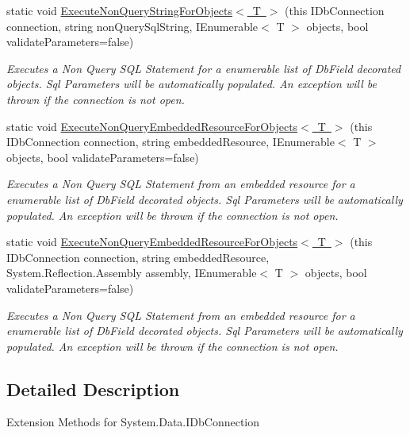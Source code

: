 \begin{DoxyCompactItemize}
static void \mbox{\hyperlink{class_blue_cloud_1_1_extensions_1_1_data_1_1_i_db_connection_extensions_a3b70dc8befcb44864a49795cd865c50d}{Execute\+Non\+Query\+String\+For\+Objects$<$ T $>$}} (this I\+Db\+Connection connection, string non\+Query\+Sql\+String, I\+Enumerable$<$ T $>$ objects, bool validate\+Parameters=false)
\begin{DoxyCompactList}\small\item\em Executes a Non Query S\+QL Statement for a enumerable list of Db\+Field decorated objects. Sql Parameters will be automatically populated. An exception will be thrown if the connection is not open. \end{DoxyCompactList}\item 
static void \mbox{\hyperlink{class_blue_cloud_1_1_extensions_1_1_data_1_1_i_db_connection_extensions_a03e05fb2dd4ab39d85a77addd01b12e1}{Execute\+Non\+Query\+Embedded\+Resource\+For\+Objects$<$ T $>$}} (this I\+Db\+Connection connection, string embedded\+Resource, I\+Enumerable$<$ T $>$ objects, bool validate\+Parameters=false)
\begin{DoxyCompactList}\small\item\em Executes a Non Query S\+QL Statement from an embedded resource for a enumerable list of Db\+Field decorated objects. Sql Parameters will be automatically populated. An exception will be thrown if the connection is not open. \end{DoxyCompactList}\item 
static void \mbox{\hyperlink{class_blue_cloud_1_1_extensions_1_1_data_1_1_i_db_connection_extensions_ace41ced3582ae6d75803703d3213c099}{Execute\+Non\+Query\+Embedded\+Resource\+For\+Objects$<$ T $>$}} (this I\+Db\+Connection connection, string embedded\+Resource, System.\+Reflection.\+Assembly assembly, I\+Enumerable$<$ T $>$ objects, bool validate\+Parameters=false)
\begin{DoxyCompactList}\small\item\em Executes a Non Query S\+QL Statement from an embedded resource for a enumerable list of Db\+Field decorated objects. Sql Parameters will be automatically populated. An exception will be thrown if the connection is not open. \end{DoxyCompactList}\end{DoxyCompactItemize}


\subsection{Detailed Description}
Extension Methods for System.\+Data.\+I\+Db\+Connection 



